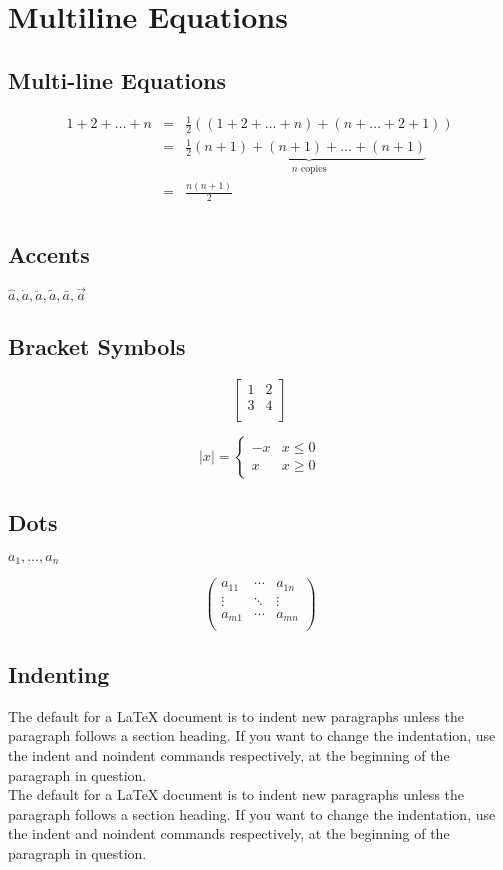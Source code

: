 \documentclass{article}
\begin{document}
\section{Multiline Equations}
\subsection{Multi-line Equations}

\begin{eqnarray*}
1+2+\ldots+n &=& \frac{1}{2}((1+2+\ldots+n)+(n+\ldots+2+1)) \\
&=& \frac{1}{2}\underbrace{(n+1)+(n+1)+\ldots+(n+1)}_{\mbox{$n$ copies}}\\
&=& \frac{n(n+1)}{2} \\
\end{eqnarray*}

\subsection{Accents}
$\hat{a}, \dot{a}, \ddot{a}, \tilde{a}, \bar{a}, \vec{a}$

\subsection{Bracket Symbols}
$$
\left[
\begin{array}{cc}
1 & 2 \\
3 & 4 \\
\end{array}
\right]
$$

$$
|x| = \left\{
\begin{array}{lr}
-x & x\le 0 \\
x & x\ge 0
\end{array}
\right.
$$

\subsection{Dots}
$a_1,\ldots,a_n$

$$
\left(
\begin{array}{ccc}
a_{11} & \cdots & a_{1n} \\
\vdots & \ddots & \vdots \\
a_{m1} & \cdots & a_{mn} \\
\end{array}
\right)
$$

\subsection{Indenting}
The default for a LaTeX document is to indent new paragraphs unless the paragraph follows a section heading. If you want to change the indentation, use the indent and noindent commands respectively, at the beginning of the paragraph in question.
\\
\indent The default for a LaTeX document is to indent new paragraphs unless the paragraph follows a section heading. If you want to change the indentation, use the indent and noindent commands respectively, at the beginning of the paragraph in question.
\end{document}
